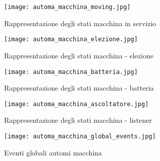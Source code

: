 \begin{figure}[htbp]
	\centering
	\texttt{[image: automa\_macchina\_moving.jpg]}
	\caption{Rappresentazione degli stati macchina in servizio}
	\label{fig:automa_moving}
\end{figure}

\begin{figure}[htbp]
	\centering
	\texttt{[image: automa\_macchina\_elezione.jpg]}
	\caption{Rappresentazione degli stati macchina - elezione}
	\label{fig:automa_elezione}
\end{figure}

\begin{figure}[htbp]
	\centering
	\texttt{[image: automa\_macchina\_batteria.jpg]}
	\caption{Rappresentazione degli stati macchina - batteria}
	\label{fig:automa_batteria}
\end{figure}

\begin{figure}[htbp]
	\centering
	\texttt{[image: automa\_macchina\_ascoltatore.jpg]}
	\caption{Rappresentazione degli stati macchina - listener}
	\label{fig:automa_listener}
\end{figure}

\begin{figure}[htbp]
	\centering
	\texttt{[image: automa\_macchina\_global\_events.jpg]}
	\caption{Eventi globali automi macchina}
	\label{fig:various}
\end{figure}